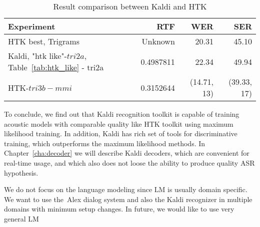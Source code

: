 \begin{table}[!htp]\label{tab:compare}\centering\begin{tabular}{l|rrr}
    Experiment   & \ac{RTF} & \ac{WER} & \ac{SER} \\
\hline
\hline
\ac{HTK} best, Trigrams   & Unknown  & 20.31  & 45.10  \\
Kaldi, "htk like"-$tri2a$, Table~\ref{tab:htk_like} - tri2a & 0.4987811 & 22.34 & 49.94\\
\hline
\ac{HTK}-$tri3b-mmi$       & 0.3152644     & (14.71, 13) & (39.33, 17)\\ 
\end{tabular} \caption{Result comparison between Kaldi and \ac{HTK}} \end{table}  

To conclude, we find out that Kaldi recognition toolkit is capable of training acoustic models with comparable quality 
like \ac{HTK} toolkit using maximum likelihood training. In addition, Kaldi has rich set of tools for discriminative training, 
which outperforms the maximum likelihood methods.
In Chapter~\ref{cha:decoder} we will describe Kaldi decoders, which are convenient for real-time usage, 
and which also does not loose the ability to produce quality ASR hypothesis.

We do not focus on the language modeling since \ac{LM} is usually domain specific.
We want to use the~Alex dialog system and also the Kaldi recognizer in multiple domains with minimum
setup changes. 
In future, we would like to use very general \ac{LM} 







